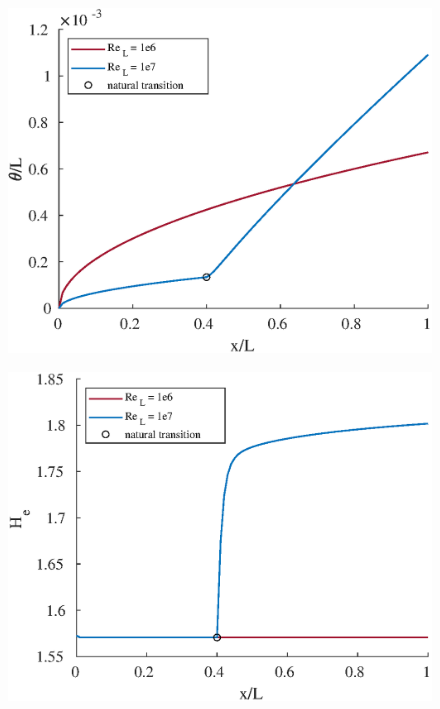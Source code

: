 



\begin{figure}[H]
\centering
\includegraphics[scale=0.8]{graphs/e6g1.eps}
\caption{}
\label{e6g1}
\end{figure}

\begin{figure}[H]
\centering
\includegraphics[scale=0.8]{graphs/e6g2.eps}
\caption{}
\label{e6g2}
\end{figure}

